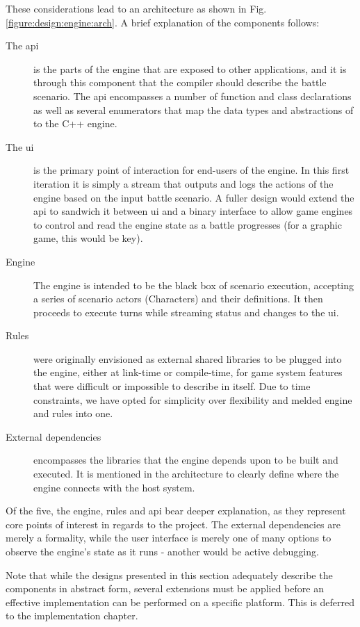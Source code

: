 These considerations lead to an architecture as shown in Fig. \vref{figure:design:engine:arch}. A brief explanation of the components follows:

\begin{description}
	\item[The \ac{api}] is the parts of the engine that are exposed to other applications, and it is through this component that the compiler should describe the battle scenario. The \ac{api} encompasses a number of function and class declarations as well as several enumerators that map the data types and abstractions of \langname{} to the C++ engine.
	\item[The \ac{ui}] is the primary point of interaction for end-users of the engine. In this first iteration it is simply a stream that outputs and logs the actions of the engine based on the input battle scenario. A fuller design would extend the \ac{api} to sandwich it between \ac{ui} and a binary interface to allow game engines to control and read the engine state as a battle progresses (for a graphic game, this would be key).
	\item[Engine] The engine is intended to be the black box of scenario execution, accepting a series of scenario actors (Characters) and their definitions. It then proceeds to execute turns while streaming status and changes to the \ac{ui}.
	\item[Rules] were originally envisioned as external shared libraries to be plugged into the engine, either at link-time or compile-time, for game system features that were difficult or impossible to describe in \langname{} itself. Due to time constraints, we have opted for simplicity over flexibility and melded engine and rules into one. 
	\item[External dependencies] encompasses the libraries that the engine depends upon to be built and executed. It is mentioned in the architecture to clearly define where the \langname{} engine connects with the host system.
\end{description}

Of the five, the engine, rules and \ac{api} bear deeper explanation, as they represent core points of interest in regards to the project. The external dependencies are merely a formality, while the user interface is merely one of many options to observe the engine's state as it runs - another would be active debugging.

Note that while the designs presented in this section adequately describe the components in abstract form, several extensions must be applied before an effective implementation can be performed on a specific platform. This is deferred to the implementation chapter.


